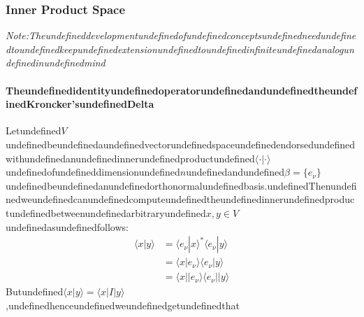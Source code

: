 \subsubsection{Inner Product Space}

\textit{Note:Theundefineddevelopmentundefinedofundefinedconceptsundefinedneedundefinedtoundefinedkeepundefinedextensionundefinedtoundefinedinfiniteundefinedanalogundefinedinundefinedmind}

\paragraph{TheundefinedidentityundefinedoperatorundefinedandundefinedtheundefinedKroncker'sundefinedDelta}

Letundefined$V$undefinedbeundefinedaundefinedvectorundefinedspaceundefinedendorsedundefinedwithundefinedanundefinedinnerundefinedproductundefined$\langle\cdot| \cdot \rangle$undefinedofundefineddimensionundefined$n$undefinedandundefined$\beta = \{e_\nu\}$undefinedbeundefinedanundefinedorthonormalundefinedbasis.undefinedThenundefinedweundefinedcanundefinedcomputeundefinedtheundefinedinnerundefinedproductundefinedbetweenundefinedarbitraryundefined$x,y\in V$undefinedasundefinedfollows:
\begin{equation}
\begin{aligned}
\langle x | y \rangle  &= \langle e_{\nu} | x \rangle^* \langle e_{\nu} | y\rangle \\ 
&= \langle x | e_{\nu} \rangle \langle e_{\nu} | y\rangle \\
&= \langle x \lvert |e_{\nu} \rangle \langle e_{\nu}|  \rvert y\rangle
\end{aligned}
\end{equation}
Butundefined$\langle x | y \rangle = \langle x | I | y \rangle$,undefinedhenceundefinedweundefinedgetundefinedthat

